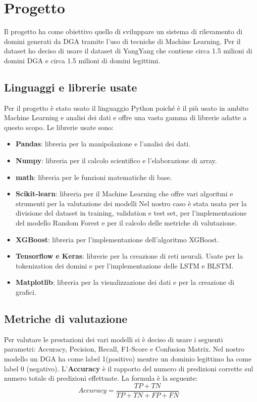 \documentclass[12pt,a4paper,openright,twoside]{book}
\begin{document}
\chapter{Progetto}
Il progetto ha come obiettivo quello di sviluppare un sistema
di rilevamento di domini generati da \acrshort{DGA} tramite
l'uso di tecniche di Machine Learning. 
Per il dataset ho deciso di usare il dataset di YangYang \cite{dataset_yangyang}
che contiene circa 1.5 milioni di domini \acrshort{DGA} e circa 1.5 milioni di domini legittimi.

\section{Linguaggi e librerie usate}
Per il progetto è stato usato il linguaggio Python poiché è il più usato
in ambito Machine Learning e analisi dei dati e offre una vasta gamma di librerie
adatte a questo scopo. Le librerie usate sono:
\begin{itemize}
    \item \textbf{Pandas}: libreria per la manipolazione e l'analisi dei dati.
    \item \textbf{Numpy}: libreria per il calcolo scientifico e l'elaborazione di array.
    \item \textbf{math}: libreria per le funzioni matematiche di base.
    \item \textbf{Scikit-learn}: libreria per il Machine Learning che offre vari algoritmi
    e strumenti per la valutazione dei modelli Nel nostro caso è stata usata per 
    la divisione del dataset in training, validation e test set,
    per l'implementazione del modello Random Forest e per il calcolo delle metriche di valutazione.
    \item \textbf{XGBoost}: libreria per l'implementazione dell'algoritmo XGBoost.
    \item \textbf{Tensorflow e Keras}: librerie per la creazione di reti neurali. Usate per la
    tokenization dei domini e per l'implementazione delle LSTM e BLSTM.
    \item \textbf{Matplotlib}: libreria per la visualizzazione dei dati e per la creazione di grafici.
\end{itemize}

\section{Metriche di valutazione}
Per valutare le prestazioni dei vari modelli si è deciso di usare i seguenti
parametri:
Accuracy, Pecision, Recall, F1-Score e Confusion Matrix. \hfill \break
Nel nostro modello un DGA ha come label 1(positivo) mentre un dominio legittimo ha come label 0 (negativo).
L'\textbf{Accuracy} è il rapporto del numero di predizioni
corrette sul numero totale di predizioni effettuate.
La formula è la seguente:
\begin{equation}
    Accuracy = \frac{TP + TN}{TP + TN + FP + FN}
\end{equation}
\end{document}
